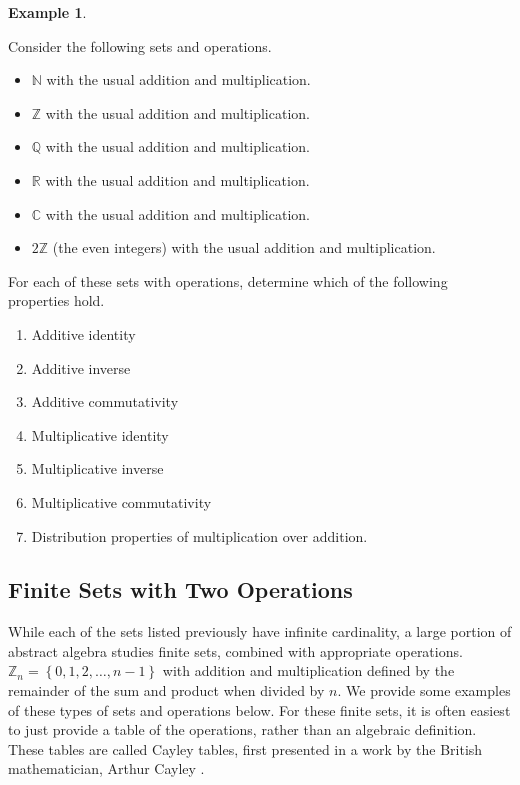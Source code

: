 \documentclass[
]{book}
\theoremstyle{definition}
\theoremstyle{definition}
\newtheorem{example}{Example}[chapter]
\theoremstyle{definition}
\theoremstyle{definition}
\theoremstyle{remark}
\begin{document}
\begin{example}
\protect\hypertarget{exm:exrings}{}\label{exm:exrings}

Consider the following sets and operations.

\begin{itemize}
\item
  \(\mathbb{N}\) with the usual addition and multiplication.
\item
  \(\mathbb{Z}\) with the usual addition and multiplication.
\item
  \(\mathbb{Q}\) with the usual addition and multiplication.
\item
  \(\mathbb{R}\) with the usual addition and multiplication.
\item
  \(\mathbb{C}\) with the usual addition and multiplication.
\item
  \(2\mathbb{Z}\) (the even integers) with the usual addition and multiplication.
\end{itemize}

For each of these sets with operations, determine which of the following properties hold.

\begin{enumerate}
\def\labelenumi{\arabic{enumi}.}
\item
  Additive identity
\item
  Additive inverse
\item
  Additive commutativity
\item
  Multiplicative identity
\item
  Multiplicative inverse
\item
  Multiplicative commutativity
\item
  Distribution properties of multiplication over addition.
\end{enumerate}

\end{example}

\hypertarget{finite-sets-with-two-operations}{%
\subsection{Finite Sets with Two Operations}\label{finite-sets-with-two-operations}}

While each of the sets listed previously have infinite cardinality, a large portion of abstract algebra studies finite sets, combined with appropriate operations. \(\mathbb{Z}_n = \left\{0, 1, 2, \ldots, n-1\right\}\) with addition and multiplication defined by the remainder of the sum and product when divided by \(n\). We provide some examples of these types of sets and operations below. For these finite sets, it is often easiest to just provide a table of the operations, rather than an algebraic definition. These tables are called Cayley tables, first presented in a work by the British mathematician, Arthur Cayley \citeyearpar{Cayley}.
\end{document}
